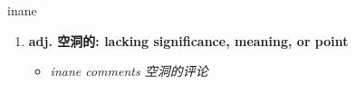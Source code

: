 
\begin{frame}
{\huge inane}
\begin{center}
\begin{enumerate}\Large
  \item \textbf{adj. 空洞的: lacking significance, meaning, or point}
  \begin{itemize}
    \item \em{\Large{inane comments 空洞的评论}}
  \end{itemize}
\end{enumerate}
\end{center}
\end{frame}
